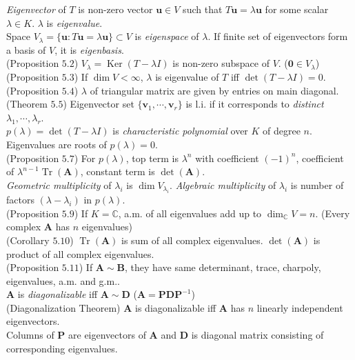 \documentclass{article}
\theoremstyle{definition}
\DeclareMathOperator{\Ker}{Ker}
\DeclareMathOperator{\Tr}{Tr}
\begin{document}
\textit{Eigenvector} of $T$ is non-zero vector $\mathbf{u}\in V$ such that $T\mathbf{u}=\lambda\mathbf{u}$ for some scalar $\lambda\in K$. $\lambda$ is \textit{eigenvalue}.\\
Space $V_{\lambda}=\{\mathbf{u}:T\mathbf{u}=\lambda\mathbf{u}\}\subset V$ is \textit{eigenspace} of $\lambda$. If finite set of eigenvectors form a basis of $V$, it is \textit{eigenbasis}.\\
(Proposition $5.2$) $V_{\lambda}=\Ker(T-\lambda I)$ is non-zero subspace of $V$. ($\mathbf{0}\in V_{\lambda}$)\\
(Proposition $5.3$) If $\dim{V}<\infty$, $\lambda$ is eigenvalue of $T$ iff $\det(T-\lambda I)=0$.\\
(Proposition $5.4$) $\lambda$ of triangular matrix are given by entries on main diagonal.\\
(Theorem $5.5$) Eigenvector set $\{\mathbf{v}_{1},\cdots,\mathbf{v}_{r}\}$ is l.i. if it corresponds to \textit{distinct} $\lambda_{1},\cdots,\lambda_{r}$.\\
$p(\lambda)=\det(T-\lambda I)$ is \textit{characteristic polynomial} over $K$ of degree $n$. Eigenvalues are roots of $p(\lambda)=0$.\\
(Proposition $5.7$) For $p(\lambda)$, top term is $\lambda^{n}$ with coefficient $(-1)^{n}$, coefficient of $\lambda^{n-1}\Tr(\mathbf{A})$, constant term is $\det(\mathbf{A})$.\\
\textit{Geometric multiplicity} of $\lambda_{i}$ is $\dim{V_{\lambda_{i}}}$. \textit{Algebraic multiplicity} of $\lambda_{i}$ is number of factors $(\lambda-\lambda_{i})$ in $p(\lambda)$.\\
(Proposition $5.9$) If $K=\mathbb{C}$, a.m. of all eigenvalues add up to $\dim_{\mathbb{C}}{V}=n$. (Every complex $\mathbf{A}$ has $n$ eigenvalues)\\
(Corollary $5.10$) $\Tr(\mathbf{A})$ is sum of all complex eigenvalues. $\det(\mathbf{A})$ is product of all complex eigenvalues.\\
(Proposition $5.11$) If $\mathbf{A}\sim\mathbf{B}$, they have same determinant, trace, charpoly, eigenvalues, a.m. and g.m..\\
$\mathbf{A}$ is \textit{diagonalizable} iff $\mathbf{A}\sim\mathbf{D}$ ($\mathbf{A}=\mathbf{PDP}^{-1}$)\\
(Diagonalization Theorem) $\mathbf{A}$ is diagonalizable iff $\mathbf{A}$ has $n$ linearly independent eigenvectors.\\
Columns of $\mathbf{P}$ are eigenvectors of $\mathbf{A}$ and $\mathbf{D}$ is diagonal matrix consisting of corresponding eigenvalues.\\
\end{document}
